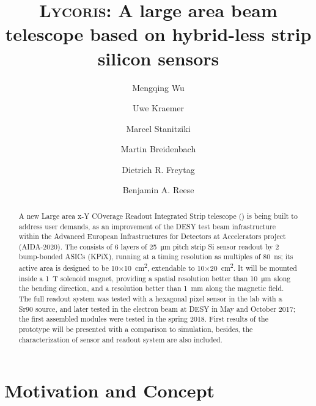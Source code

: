 



\title{\textsc{Lycoris}: A large area beam telescope based on hybrid-less strip silicon sensors}
\author[*]{Mengqing Wu}
\author[*]{Uwe Kraemer}
\author[*]{Marcel Stanitziki}
\author[**]{Martin Breidenbach}
\author[**]{Dietrich R. Freytag}
\author[**]{Benjamin A. Reese}

\maketitle

\begin{abstract}

A new Large area x-Y COverage Readout Integrated Strip telescope (\lycoris) is being built to address user demands,
as an improvement of the DESY test beam infrastructure within the Advanced European Infrastructures for Detectors at Accelerators project (AIDA-2020).
The \lycoris consists of 6 layers of \SI{25}{\micro\metre} pitch strip Si sensor readout by 2 bump-bonded ASICs (KPiX),
running at a timing resolution as multiples of \SI{80}{\nano\second};
its active area is designed to be 10$\times$\SI{10}{\square\centi\metre}, extendable to 10$\times$\SI{20}{\square\centi\metre}.
It will be mounted inside a \SI{1}{\tesla} solenoid magnet,
providing a spatial resolution better than \SI{10}{\micro\metre} along the bending direction,
and a resolution better than \SI{1}{\milli\metre} along the magnetic field.
The full readout system was tested with a hexagonal pixel sensor in the lab with a Sr90 source,
and later tested in the electron beam at DESY in May and October 2017;
the first assembled modules were tested in the spring 2018.
First results of the \lycoris prototype will be presented with a comparison to simulation,
besides, the characterization of sensor and readout system are also included.
\end{abstract}

\section*{Motivation and Concept}

